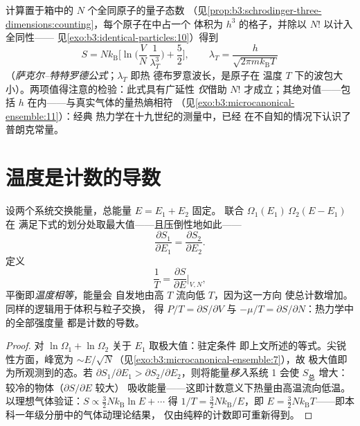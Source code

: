 \begin{proposition}[理想气体的熵]\label{prop:b3:microcanonical-ensemble:gas}
计算置于箱中的 $N$ 个全同原子的量子态数
（见\cref{prop:b3:schrodinger-three-dimensions:counting}，每个原子在中占一个
体积为 $h^3$ 的格子，并除以 $N!$ 以计入全同性——
见\cref{exo:b3:identical-particles:10}）得到
\[
S = Nk_{\text{B}}\Big[\ln\Big(\frac VN\,\frac1{\lambda_T^3}\Big)
 + \frac52\Big] , \qquad
\lambda_T = \frac{h}{\sqrt{2\pi mk_{\text{B}}T}}
\]
（\emph{萨克尔–特特罗德公式}；$\lambda_T$ 即热
德布罗意波长，是原子在
温度 $T$ 下的波包大小）。两项值得注意的检验：此式具有广延性
\emph{仅}借助 $N!$ 才成立；其绝对值——包括
$h$ 在内——与真实气体的量热熵相符
（见\cref{exo:b3:microcanonical-ensemble:11}）：经典
热力学在十九世纪的测量中，已经
在不自知的情况下认识了普朗克常量。
\end{proposition}
\admitted

\section{温度是计数的导数}

\begin{theorem}[平衡与温度]\label{thm:b3:microcanonical-ensemble:temperature}
设两个系统交换能量，总能量 $E = E_1 + E_2$ 固定。
联合 $\Omega_1(E_1)\,\Omega_2(E - E_1)$ 在
满足下式的划分处取最大值——且压倒性地如此——
\[
\frac{\partial S_1}{\partial E_1} =
\frac{\partial S_2}{\partial E_2} .
\]
定义
\[
\frac1T = \frac{\partial S}{\partial E}\bigg|_{V,N} ,
\]
平衡即\emph{温度相等}，能量会
自发地由高 $T$ 流向低 $T$，因为这一方向
使总计数增加。同样的逻辑用于体积与粒子交换，
得 $P/T = \partial S/\partial V$ 与 $-\mu/T
= \partial S/\partial N$：热力学中的全部强度量
都是计数的导数。
\end{theorem}

\begin{proof}
对 $\ln\Omega_1 + \ln\Omega_2$ 关于 $E_1$ 取极大值：驻定条件
即上文所述的等式。尖锐性方面，峰宽为
$\sim E/\sqrt N$（见\cref{exo:b3:microcanonical-ensemble:7}），故
极大值即为所观测到的态。若 $\partial S_1/\partial E_1 >
\partial S_2/\partial E_2$，则将能量\emph{移入}系统 1 会使
$S_{\text{总}}$ 增大：较冷的物体（$\partial S/\partial E$ 较大）
吸收能量——这即计数意义下热量由高温流向低温。
以理想气体验证：$S \propto \tfrac32 Nk_{\text{B}}\ln E + \cdots$
得 $1/T = \tfrac32 Nk_{\text{B}}/E$，即 $E = \tfrac32
Nk_{\text{B}}T$——即本科一年级分册中的气体动理论结果，
仅由纯粹的计数即可重新得到。
\end{proof}

